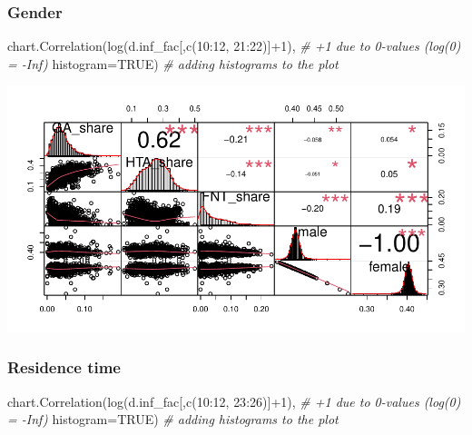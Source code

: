 \documentclass[
]{article}
\newenvironment{Shaded}{\begin{snugshade}}{\end{snugshade}}
\newcommand{\AttributeTok}[1]{\textcolor[rgb]{0.77,0.63,0.00}{#1}}
\newcommand{\CommentTok}[1]{\textcolor[rgb]{0.56,0.35,0.01}{\textit{#1}}}
\newcommand{\ConstantTok}[1]{\textcolor[rgb]{0.00,0.00,0.00}{#1}}
\newcommand{\DecValTok}[1]{\textcolor[rgb]{0.00,0.00,0.81}{#1}}
\newcommand{\FunctionTok}[1]{\textcolor[rgb]{0.00,0.00,0.00}{#1}}
\newcommand{\NormalTok}[1]{#1}
\newcommand{\SpecialCharTok}[1]{\textcolor[rgb]{0.00,0.00,0.00}{#1}}
\begin{document}
\hypertarget{gender}{%
\subsubsection{Gender}\label{gender}}

\begin{Shaded}
\begin{Highlighting}[]
\FunctionTok{chart.Correlation}\NormalTok{(}\FunctionTok{log}\NormalTok{(d.inf\_fac[,}\FunctionTok{c}\NormalTok{(}\DecValTok{10}\SpecialCharTok{:}\DecValTok{12}\NormalTok{, }\DecValTok{21}\SpecialCharTok{:}\DecValTok{22}\NormalTok{)]}\SpecialCharTok{+}\DecValTok{1}\NormalTok{), }\CommentTok{\# +1 due to 0{-}values (log(0) = {-}Inf)}
                  \AttributeTok{histogram=}\ConstantTok{TRUE}\NormalTok{) }\CommentTok{\# adding histograms to the plot}
\end{Highlighting}
\end{Shaded}

\includegraphics{Lin_Mod_Clus_Anal_files/figure-latex/unnamed-chunk-8-1.pdf}

\hypertarget{residence-time}{%
\subsubsection{Residence time}\label{residence-time}}

\begin{Shaded}
\begin{Highlighting}[]
\FunctionTok{chart.Correlation}\NormalTok{(}\FunctionTok{log}\NormalTok{(d.inf\_fac[,}\FunctionTok{c}\NormalTok{(}\DecValTok{10}\SpecialCharTok{:}\DecValTok{12}\NormalTok{, }\DecValTok{23}\SpecialCharTok{:}\DecValTok{26}\NormalTok{)]}\SpecialCharTok{+}\DecValTok{1}\NormalTok{), }\CommentTok{\# +1 due to 0{-}values (log(0) = {-}Inf)}
                  \AttributeTok{histogram=}\ConstantTok{TRUE}\NormalTok{) }\CommentTok{\# adding histograms to the plot}
\end{Highlighting}
\end{Shaded}
\end{document}
